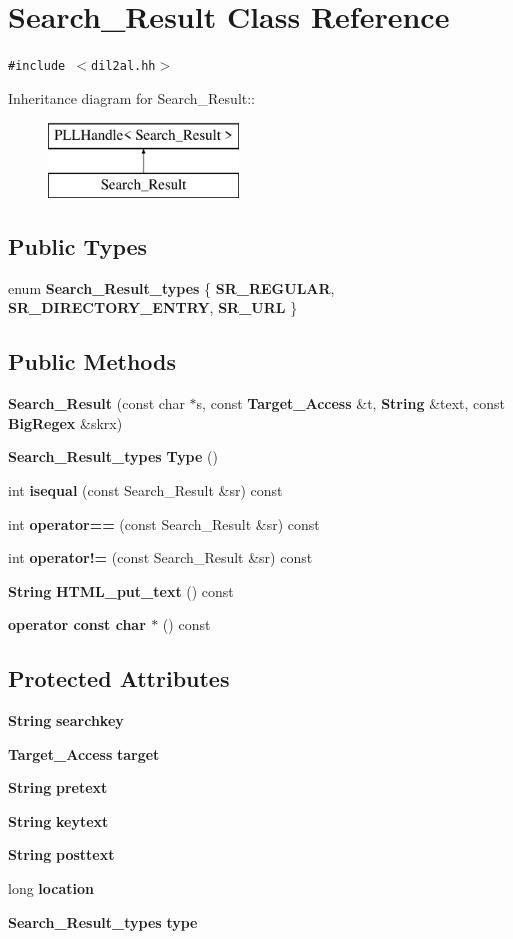\section{Search\_\-Result  Class Reference}
\label{classSearch__Result}
{\tt \#include $<$dil2al.hh$>$}

Inheritance diagram for Search\_\-Result::\begin{figure}[H]
\begin{center}
\leavevmode
\includegraphics[height=2cm]{classSearch__Result}
\end{center}
\end{figure}
\subsection*{Public Types}
\begin{CompactItemize}
\item 
enum {\bf Search\_\-Result\_\-types} \{ {\bf SR\_\-REGULAR}, 
{\bf SR\_\-DIRECTORY\_\-ENTRY}, 
{\bf SR\_\-URL}
 \}
\end{CompactItemize}
\subsection*{Public Methods}
\begin{CompactItemize}
\item 
{\bf Search\_\-Result} (const char $\ast$s, const {\bf Target\_\-Access} \&t, {\bf String} \&text, const {\bf Big\-Regex} \&skrx)
\item 
{\bf Search\_\-Result\_\-types} {\bf Type} ()
\item 
int {\bf isequal} (const Search\_\-Result \&sr) const
\item 
int {\bf operator==} (const Search\_\-Result \&sr) const
\item 
int {\bf operator!=} (const Search\_\-Result \&sr) const
\item 
{\bf String} {\bf HTML\_\-put\_\-text} () const
\item 
{\bf operator const char $\ast$} () const
\end{CompactItemize}
\subsection*{Protected Attributes}
\begin{CompactItemize}
\item 
{\bf String} {\bf searchkey}
\item 
{\bf Target\_\-Access} {\bf target}
\item 
{\bf String} {\bf pretext}
\item 
{\bf String} {\bf keytext}
\item 
{\bf String} {\bf posttext}
\item 
long {\bf location}
\item 
{\bf Search\_\-Result\_\-types} {\bf type}
\end{CompactItemize}


